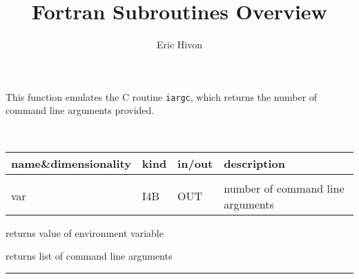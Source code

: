 \sloppy

\title{\healpix Fortran Subroutines Overview}
 \section[nArguments]{ }
\label{sub:narguments}
\author{Eric Hivon}

\begin{facility}
{This function emulates the C routine {\tt iargc}, which returns the number of
command line arguments provided.}
{\modExtension}
\end{facility}

\begin{f90function}
{\ }
\end{f90function}

\begin{arguments}
{
\begin{tabular}{p{0.3\hsize} p{0.05\hsize} p{0.1\hsize} p{0.45\hsize}} \hline  
\textbf{name\&dimensionality} & \textbf{kind} & \textbf{in/out} & \textbf{description} \\ \hline
                   &   &   &                           \\ %
var & I4B & OUT & number of command line arguments

\end{tabular}}
\end{arguments}


\begin{related}
  \begin{sulist}{} %
  \item[\htmlref{getEnvironment}{sub:getenvironment}] returns value of
  environment variable
  \item[\htmlref{getArgument}{sub:getargument}] returns list of command line arguments
  \end{sulist}
\end{related}

\rule{\hsize}{2mm}

\newpage
